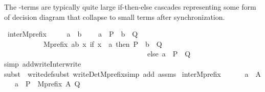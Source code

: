 \begin{isabellebody}
\begin{isamarkuptext}
The  -terms are typically
quite large if-then-else cascades representing some form of decision diagram that collapse to 
small terms after synchronization.%
\end{isamarkuptext}\isamarkuptrue%
\isamarkupfalse%
\ inter{}Mprefix{}{\isacharcolon}{\kern0pt}\ \isanewline
\ \ \ \ {\isachardoublequoteopen}a\ {\isasymnoteq}\ b{\isachardoublequoteclose}\ \isanewline
\ \ \ {\isachardoublequoteopen}{\isacharparenleft}{\kern0pt}a\ {\isasymrightarrow}\ P\ {\isacharbar}{\kern0pt}{\isacharbar}{\kern0pt}{\isacharbar}{\kern0pt}\ b\ {\isasymrightarrow}\ Q{\isacharparenright}{\kern0pt}\ \isanewline
\ \ \ \ \ \ \ \ \ \ {\isacharequal}{\kern0pt}\ Mprefix\ {\isacharbraceleft}{\kern0pt}a{\isacharcomma}{\kern0pt}b{\isacharbraceright}{\kern0pt}\ {\isacharparenleft}{\kern0pt}{\isasymlambda}x{\isachardot}{\kern0pt}\ if\ x\ {\isacharequal}{\kern0pt}\ a\ then\ {\isacharparenleft}{\kern0pt}P\ {\isacharbar}{\kern0pt}{\isacharbar}{\kern0pt}{\isacharbar}{\kern0pt}\ b\ {\isasymrightarrow}\ Q{\isacharparenright}{\kern0pt}\ \isanewline
\ \ \ \ \ \ \ \ \ \ \ \ \ \ \ \ \ \ \ \ \ \ \ \ \ \ \ \ \ \ \ \ \ \ \ \ \ \ \ \ else\ {\isacharparenleft}{\kern0pt}a\ {\isasymrightarrow}\ P{\isacharparenright}{\kern0pt}\ {\isacharbar}{\kern0pt}{\isacharbar}{\kern0pt}{\isacharbar}{\kern0pt}\ Q\ {\isacharparenright}{\kern0pt}{\isachardoublequoteclose}\isanewline
%
\isadelimproof
\ \ %
\endisadelimproof
%
\isatagproof
{}\isamarkupfalse%
{\isacharparenleft}{\kern0pt}simp\ add{\isacharcolon}{\kern0pt}write{}{\isacharunderscore}{\kern0pt}Inter{\isacharunderscore}{\kern0pt}write{}{\isacharparenright}{\kern0pt}\isanewline
\ \ \isamarkupfalse%
{\isacharparenleft}{\kern0pt}subst\ {\isacharparenleft}{\kern0pt}{}{\isacharparenright}{\kern0pt}\ write{}{\isacharunderscore}{\kern0pt}def{\isacharcomma}{\kern0pt}subst\ write{}{\isacharunderscore}{\kern0pt}Det{\isacharunderscore}{\kern0pt}Mprefix{\isacharcomma}{\kern0pt}simp\ add{\isacharcolon}{\kern0pt}\ assms{\isacharparenright}{\kern0pt}%
\endisatagproof
{\isafoldproof}%
%
\isadelimproof
\isanewline
%
\endisadelimproof
\isanewline
\isanewline
{}\isamarkupfalse%
\ inter{}Mprefix{}{\isacharcolon}{\kern0pt}\ \isanewline
\ \ \ {\isacharasterisk}{\kern0pt}\ {\isacharcolon}{\kern0pt}\ {\isachardoublequoteopen}a\ {\isasymnotin}\ A{\isachardoublequoteclose}\isanewline
\ \ \ {\isachardoublequoteopen}{\isacharparenleft}{\kern0pt}{\isacharparenleft}{\kern0pt}a\ {\isasymrightarrow}\ P{\isacharparenright}{\kern0pt}\ {\isacharbar}{\kern0pt}{\isacharbar}{\kern0pt}{\isacharbar}{\kern0pt}\ Mprefix\ A\ Q{\isacharparenright}{\kern0pt}\ \isanewline

\end{isabellebody}
